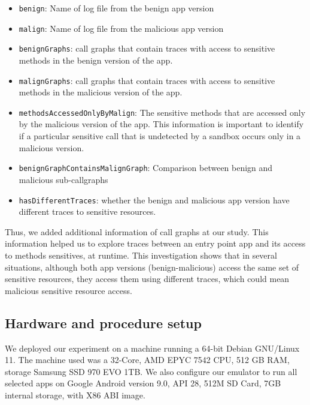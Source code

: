 \begin{itemize}
\item \texttt{benign}: Name of log file from the benign app version
\item \texttt{malign}: Name of log file from the malicious app version
\item \texttt{benignGraphs}: call graphs that contain traces with access to sensitive methods in the benign version of the app.
\item \texttt{malignGraphs}: call graphs that contain traces with access to sensitive methods in the malicious version of the app.
\item \texttt{methodsAccessedOnlyByMalign}: The sensitive methods that are accessed only by the malicious version of the app. This information is important to identify if a particular sensitive call that is undetected by a sandbox occurs only in a malicious version.
\item \texttt{benignGraphContainsMalignGraph}: Comparison between benign and malicious sub-callgraphs
\item \texttt{hasDifferentTraces}: whether the benign and malicious app version have different traces to sensitive resources. 
\end{itemize}

Thus, we added additional information of call graphs at our study. This information helped us to explore traces between an entry point app and its access to methods sensitives, at runtime. This investigation shows that in several situations, although both app versions (benign-malicious) access the same set of sensitive resources, they access them using different traces, which could mean malicious sensitive resource access.

\subsection{Hardware and procedure setup}

We deployed our experiment on a machine running a 64-bit Debian  GNU/Linux 11. The machine used was  a 32-Core, AMD EPYC 7542 CPU, 512 GB RAM, storage Samsung SSD 970 EVO 1TB. We also configure our emulator to run all selected apps on Google Android version 9.0, API 28, 512M SD Card, 7GB internal storage, with X86 ABI image.

